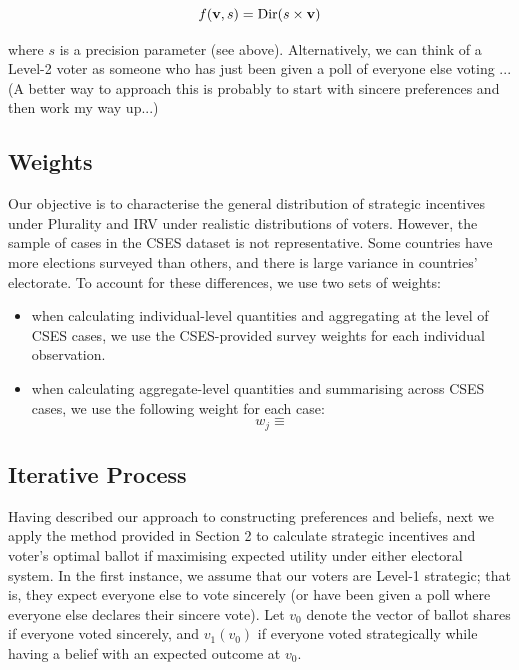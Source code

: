 \documentclass[12pt, letter]{article}
\begin{document}
\begin{equation}
	f({\bf v}, s) = \text{Dir}(s \times {\bf v})
\end{equation}

where $s$ is a precision parameter (see above). Alternatively, we can think of a Level-2 voter as someone who has just been given a poll of everyone else voting ...(A better way to approach this is probably to start with sincere preferences and then work my way up...)

\subsection{Weights}

Our objective is to characterise the general distribution of strategic incentives under Plurality and IRV under realistic distributions of voters. However, the sample of cases in the CSES dataset is not representative. Some countries have more elections surveyed than others, and there is large variance in countries' electorate. To account for these differences, we use two sets of weights:

\begin{itemize}
	\item when calculating individual-level quantities and aggregating at the level of CSES cases, we use the CSES-provided survey weights for each individual observation.
	\item when calculating aggregate-level quantities and summarising across CSES cases, we use the following weight for each case:
	\begin{equation}
		w_j \equiv 
	\end{equation}
\end{itemize}

\subsection{Iterative Process}

Having described our approach to constructing preferences and beliefs, next we apply the method provided in Section 2 to calculate strategic incentives and voter's optimal ballot if maximising expected utility under either electoral system. In the first instance, we assume that our voters are Level-1 strategic; that is, they expect everyone else to vote sincerely (or have been given a poll where everyone else declares their sincere vote). Let $v_0$ denote the vector of ballot shares if everyone voted sincerely, and $v_1(v_0)$ if everyone voted strategically while having a belief with an expected outcome at $v_0$. 
\end{document}
